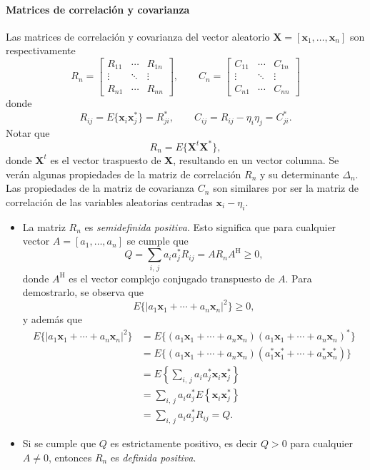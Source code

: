 \documentclass[a4paper]{report}
\newcommand{\X}{\mathbf{X}}
\newcommand{\x}{\mathbf{x}}
\begin{document}
\paragraph{Matrices de correlación y covarianza} 

Las matrices de correlación y covarianza del vector aleatorio \(\X=[\x_1,\dots,\x_n]\) son respectivamente
\[
R_n=
\begin{bmatrix}
 R_{11} & \cdots & R_{1n}\\
 \vdots & \ddots & \vdots\\
 R_{n1} & \cdots & R_{nn}
\end{bmatrix},
\qquad
C_n=
\begin{bmatrix}
 C_{11} & \cdots & C_{1n}\\
 \vdots & \ddots & \vdots\\
 C_{n1} & \cdots & C_{nn}
\end{bmatrix}
\]
donde
\[
 R_{ij}=E\{\x_i\x_j^*\}=R^*_{ji},
 \qquad
 C_{ij}=R_{ij}-\eta_{i}\eta_{j}=C^*_{ji}.
\]
Notar que
\[
 R_n=E\{\X^t\X^*\},
\]
donde \(\X^t\) es el vector traspuesto de \(\X\), resultando en un vector columna. Se verán algunas propiedades de la matriz de correlación \(R_n\) y su determinante \(\Delta_n\). Las propiedades de la matriz de covarianza \(C_n\) son similares por ser la matriz de correlación de las variables aleatorias centradas \(\x_i-\eta_i\).
\begin{itemize}
 \item La matriz \(R_n\) es \emph{semidefinida positiva}. Esto significa que para cualquier vector \(A=[a_1,\dots,a_n]\) se cumple que
 \[
  Q=\sum_{i,\,j}a_ia_j^*R_{ij}=AR_nA^\mathrm{H}\geq 0,
 \]
 donde \(A^\mathrm{H}\) es el vector complejo conjugado transpuesto de \(A\). Para demostrarlo, se observa que
 \[
  E\{|a_1\x_1+\cdots+a_n\x_n|^2\}\geq0,
 \]
 y además que
 \begin{align*}
  E\{|a_1\x_1+\cdots+a_n\x_n|^2\}&=E\{(a_1\x_1+\cdots+a_n\x_n)(a_1\x_1+\cdots+a_n\x_n)^*\}\\
    &=E\{(a_1\x_1+\cdots+a_n\x_n)(a^*_1\x^*_1+\cdots+a^*_n\x^*_n)\}\\
    &=E\left\{\sum_{i,\,j}a_ia_j^*\x_i\x_j^*\right\}\\
    &=\sum_{i,\,j}a_ia_j^*E\left\{\x_i\x_j^*\right\}\\
    &=\sum_{i,\,j}a_ia_j^*R_{ij}=Q.
 \end{align*}
 \item Si se cumple que \(Q\) es estrictamente positivo, es decir \(Q>0\) para cualquier \(A\neq0\), entonces \(R_n\) es \emph{definida positiva}.
\end{itemize}
\end{document}
